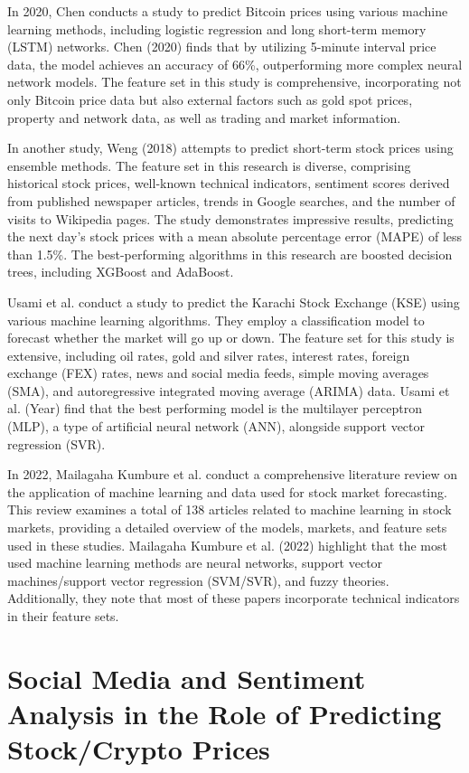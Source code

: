 In 2020, Chen conducts a study to predict Bitcoin prices using various machine learning methods, including logistic regression and long short-term memory (LSTM) networks. Chen (2020) finds that by utilizing 5-minute interval price data, the model achieves an accuracy of 66\%, outperforming more complex neural network models. The feature set in this study is comprehensive, incorporating not only Bitcoin price data but also external factors such as gold spot prices, property and network data, as well as trading and market information.

In another study, Weng (2018) attempts to predict short-term stock prices using ensemble methods. The feature set in this research is diverse, comprising historical stock prices, well-known technical indicators, sentiment scores derived from published newspaper articles, trends in Google searches, and the number of visits to Wikipedia pages. The study demonstrates impressive results, predicting the next day's stock prices with a mean absolute percentage error (MAPE) of less than 1.5\%. The best-performing algorithms in this research are boosted decision trees, including XGBoost and AdaBoost.

Usami et al. conduct a study to predict the Karachi Stock Exchange (KSE) using various machine learning algorithms. They employ a classification model to forecast whether the market will go up or down. The feature set for this study is extensive, including oil rates, gold and silver rates, interest rates, foreign exchange (FEX) rates, news and social media feeds, simple moving averages (SMA), and autoregressive integrated moving average (ARIMA) data. Usami et al. (Year) find that the best performing model is the multilayer perceptron (MLP), a type of artificial neural network (ANN), alongside support vector regression (SVR).

In 2022, Mailagaha Kumbure et al. conduct a comprehensive literature review on the application of machine learning and data used for stock market forecasting. This review examines a total of 138 articles related to machine learning in stock markets, providing a detailed overview of the models, markets, and feature sets used in these studies. Mailagaha Kumbure et al. (2022) highlight that the most used machine learning methods are neural networks, support vector machines/support vector regression (SVM/SVR), and fuzzy theories. Additionally, they note that most of these papers incorporate technical indicators in their feature sets.

\section{Social Media and Sentiment Analysis in the Role of Predicting Stock/Crypto Prices}

